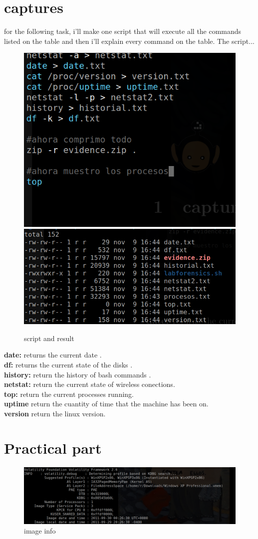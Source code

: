 \documentclass[10pt,a4paper]{article} %
\begin{document}
    \newpage
    \section{captures}
    for the following task, i'll make one script that will execute all the
    commands listed on the table and then i'll explain every command on the
    table.
    The script...
    \begin{figure}[h!]
        \centering
        \includegraphics[width=0.5\linewidth]{script.png}
        \includegraphics[width=0.5\linewidth]{result.png}
        \caption{script and result}
        \label{script}
    \end{figure}

    \textbf{date:} returns the current date .
    \\
    \textbf{df:} returns the current state of the disks .
    \\
    \textbf{history:} return the history of bash commands .
    \\
    \textbf{netstat:} return the current state of wireless conections.
    \\
    \textbf{top:} return the current processes running.
    \\
    \textbf{uptime}  return the cuantity of time that the machine has been on.
    \\
    \textbf{version} return the linux version.

    \newpage
    \section{Practical part}

    \begin{figure}[h!]
        \centering
        \includegraphics[width=0.8\linewidth]{imageinfo.png}
        \caption{image info}
        \label{volatility1}
    \end{figure}
\end{document}

